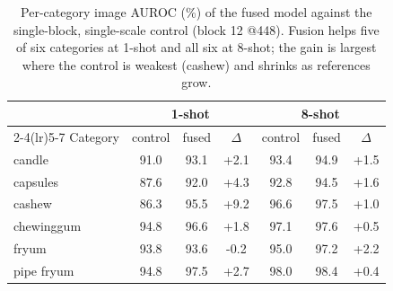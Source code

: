 \begin{table}[t]
\centering
\small
\begin{tabular}{lcccccc}
\toprule
 & \multicolumn{3}{c}{1-shot} & \multicolumn{3}{c}{8-shot} \\
\cmidrule(lr){2-4}\cmidrule(lr){5-7}
Category & control & fused & $\Delta$ & control & fused & $\Delta$ \\
\midrule
candle & 91.0 & 93.1 & +2.1 & 93.4 & 94.9 & +1.5 \\
capsules & 87.6 & 92.0 & +4.3 & 92.8 & 94.5 & +1.6 \\
cashew & 86.3 & 95.5 & +9.2 & 96.6 & 97.5 & +1.0 \\
chewinggum & 94.8 & 96.6 & +1.8 & 97.1 & 97.6 & +0.5 \\
fryum & 93.8 & 93.6 & -0.2 & 95.0 & 97.2 & +2.2 \\
pipe fryum & 94.8 & 97.5 & +2.7 & 98.0 & 98.4 & +0.4 \\
\bottomrule
\end{tabular}
\caption{Per-category image AUROC (\%) of the fused model against the single-block, single-scale control (block 12 @448). Fusion helps five of six categories at 1-shot and all six at 8-shot; the gain is largest where the control is weakest (cashew) and shrinks as references grow.}
\label{tab:gain}
\end{table}